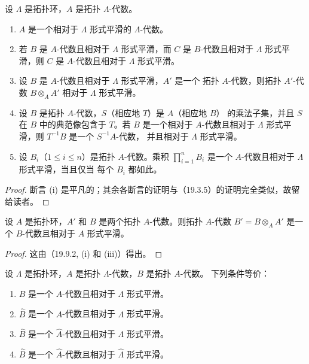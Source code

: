 \begin{proposition}[19.9.2]
\label{0.19.9.2-fr}
设 $\Lambda$ 是拓扑环，$A$ 是拓扑 $\Lambda$-代数。
\begin{enumerate}
  \item[(i)] $A$ 是一个相对于 $\Lambda$ 形式平滑的 $\Lambda$-代数。
  \item[(ii)] 若 $B$ 是 $A$-代数且相对于 $\Lambda$ 形式平滑，而 $C$ 是
  $B$-代数且相对于 $\Lambda$ 形式平滑，则 $C$ 是 $A$-代数且相对于
  $\Lambda$ 形式平滑。
  \item[(iii)] 设 $B$ 是 $A$-代数且相对于 $\Lambda$ 形式平滑，$A'$ 是一个
  拓扑 $A$-代数，则拓扑 $A'$-代数 $B\otimes_A A'$ 相对于 $\Lambda$ 形式平滑。
  \item[(iv)] 设 $B$ 是拓扑 $A$-代数，$S$（相应地 $T$）是 $A$（相应地 $B$）
  的乘法子集，并且 $S$ 在 $B$ 中的典范像包含于 $T$。若 $B$ 是一个相对于
  $A$-代数且相对于 $\Lambda$ 形式平滑，则 $T^{-1}B$ 是一个 $S^{-1}A$-代数，
  并且相对于 $\Lambda$ 形式平滑。
  \item[(v)] 设 $B_i$（$1\leq i\leq n$）是拓扑 $A$-代数。乘积
  $\prod_{i=1}^n B_i$ 是一个 $A$-代数且相对于 $\Lambda$ 形式平滑，当且仅当
  每个 $B_i$ 都如此。
\end{enumerate}
\end{proposition}

\begin{proof}
断言 (i) 是平凡的；其余各断言的证明与（19.3.5）的证明完全类似，故留给读者。
\end{proof}

\begin{corollary}[19.9.3]
\label{0.19.9.3-fr}
设 $A$ 是拓扑环，$A'$ 和 $B$ 是两个拓扑 $A$-代数。则拓扑 $A$-代数
$B'=B\otimes_A A'$ 是一个 $B$-代数且相对于 $A$ 形式平滑。
\end{corollary}

\begin{proof}
这由（19.9.2, (i) 和 (iii)）得出。
\end{proof}

\begin{proposition}[19.9.4]
\label{0.19.9.4-fr}
设 $\Lambda$ 是拓扑环，$A$ 是拓扑 $\Lambda$-代数，$B$ 是拓扑 $A$-代数。
下列条件等价：
\begin{enumerate}
  \item[a)] $B$ 是一个 $A$-代数且相对于 $\Lambda$ 形式平滑。
  \item[b)] $\widehat B$ 是一个 $A$-代数且相对于 $\Lambda$ 形式平滑。
  \item[c)] $\widehat B$ 是一个 $\widehat A$-代数且相对于 $\Lambda$ 形式平滑。
  \item[d)] $\widehat B$ 是一个 $\widehat A$-代数且相对于
  $\widehat\Lambda$ 形式平滑。
\end{enumerate}
\end{proposition}

